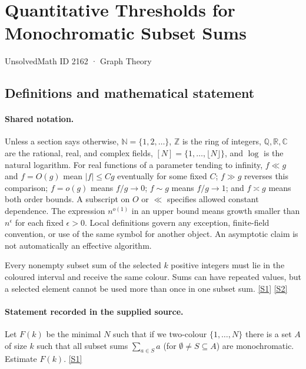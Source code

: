 \documentclass[11pt,a4paper]{article}
\newcommand{\N}{\mathbb{N}}
\newcommand{\Z}{\mathbb{Z}}
\newcommand{\Q}{\mathbb{Q}}
\newcommand{\R}{\mathbb{R}}
\newcommand{\C}{\mathbb{C}}
\newcommand{\sref}[2]{\hyperlink{source:#1:#2}{[S#2]}}
\begin{document}

\setcounter{section}{2161}

\section{Quantitative Thresholds for Monochromatic Subset Sums}\label{2162}

{\small\sffamily UnsolvedMath ID 2162 · Graph Theory}

\subsection{Definitions and mathematical statement}

\paragraph{Shared notation.}Unless a section says otherwise, $\N=\{1,2,\ldots\}$,
$\Z$ is the ring of integers, $\Q,\R,\C$ are the rational, real, and complex
fields, $[N]=\{1,\ldots,\lfloor N\rfloor\}$, and $\log$ is the natural
logarithm. For real functions of a parameter tending to infinity,
$f\ll g$ and $f=O(g)$ mean $|f|\leq Cg$ eventually for some fixed $C$;
$f\gg g$ reverses this comparison; $f=o(g)$ means $f/g\to0$;
$f\sim g$ means $f/g\to1$; and $f\asymp g$ means both order bounds.
A subscript on $O$ or $\ll$ specifies allowed constant dependence.
The expression $n^{o(1)}$ in an upper bound means growth smaller than
$n^\epsilon$ for each fixed $\epsilon>0$. Local definitions govern any
exception, finite-field convention, or use of the same symbol for another
object. An asymptotic claim is not automatically an effective algorithm.



Every nonempty subset sum of the selected $k$ positive integers must lie in the coloured interval and receive the same colour. Sums can have repeated values, but a selected element cannot be used more than once in one subset sum. \sref{2162}{1} \sref{2162}{2}

\paragraph{Statement recorded in the supplied source.}
Let $F(k)$ be the minimal $N$ such that if we two-colour $\{1,\ldots,N\}$ there is a set $A$ of size $k$ such that all subset sums $\sum_{a\in S}a$ (for $\emptyset\neq S\subseteq A$) are monochromatic. Estimate $F(k)$. \sref{2162}{1}
\end{document}
